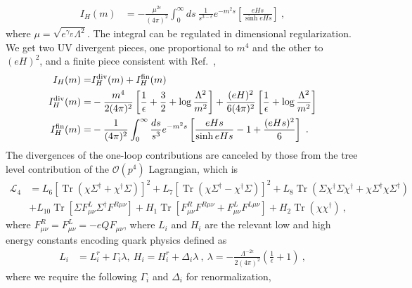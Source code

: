 \documentclass[12pt]{elsarticle}
\DeclareMathOperator{\Tr}{Tr}
\begin{document}
\begin{equation}
\begin{split}
I_{H}(m)&=-\frac{\mu^{2\epsilon}}{(4\pi)^{2}}\int_{0}^{\infty} ds\ \frac{1}{s^{3-\epsilon}}e^{-m^{2}s}\left[\frac{eHs}{\sinh eHs}\right]\ ,
\end{split}
\end{equation}
where $\mu=\sqrt{e^{\gamma_{E}}\Lambda^{2}}$. The integral can be regulated in dimensional regularization. We get two UV divergent pieces, one proportional to $m^{4}$ and the other to $(eH)^{2}$, and a finite piece consistent with Ref.~\cite{Schwinger:1951nm},
\begin{align}
I_{H}(m)=&I_{H}^{\rm div}(m)+I_{H}^{\rm fin}(m)\\
I_{H}^{\rm div}(m)=&-\frac{m^{4}}{2(4\pi)^{2}}\left[\frac{1}{\epsilon}+\frac{3}{2}+\log\frac{\Lambda^{2}}{m^{2}} \right]+\frac{(eH)^{2}}{6(4\pi)^{2}}\left[\frac{1}{\epsilon}+\log\frac{\Lambda^{2}}{m^{2}}\right]\\
I_{H}^{\rm fin}(m)=&-\frac{1}{(4\pi)^{2}}\int_{0}^{\infty} \frac{ds}{s^{3}}e^{-m^{2}s}\left[\frac{eHs}{\sinh eHs}-1+\frac{(eHs)^{2}}{6}\right]\ .
\end{align}
The divergences of the one-loop contributions are canceled by those from the tree level contribution of the $\mathcal{O}(p^{4})$ Lagrangian, which is
\begin{equation}
\begin{split}
\label{eq:L4}
\mathcal{L}_{4}&=L_{6}\left [\Tr(\chi\Sigma^{\dagger}+\chi^{\dagger}\Sigma)\right ]^{2}+L_{7}\left [\Tr(\chi\Sigma^{\dagger}-\chi^{\dagger}\Sigma)\right ]^{2}+L_{8}\Tr \left(\Sigma \chi^{\dagger}\Sigma \chi^{\dagger}+\chi\Sigma^{\dagger}\chi\Sigma^{\dagger} \right )\\
&+L_{10}\Tr\left [\Sigma F_{\mu\nu}^{L}\Sigma^{\dagger}F^{R\mu\nu}\right ]+H_{1}\Tr\left [F_{\mu\nu}^{R}F^{R\mu\nu}+F_{\mu\nu}^{L}F^{L\mu\nu} \right ]+H_{2}\Tr(\chi \chi^{\dagger})\ ,
\end{split}
\end{equation}
where $F_{\mu\nu}^{R}=F_{\mu\nu}^{L}=-eQF_{\mu\nu}$, where $L_{i}$ and $H_{i}$ are the relevant low and high energy constants encoding quark physics defined as
\begin{align}
\label{lihi}
L_{i}&=L_{i}^{r}+\Gamma_{i}\lambda,\ H_{i}=H_{i}^{r}+\Delta_{i}\lambda\ ,\ \lambda=-\frac{\Lambda^{-2\epsilon}}{2(4\pi)^{2}}\left(\frac{1}{\epsilon}+1\right)\ ,
\end{align}
where we require the following $\Gamma_{i}$ and $\Delta_{i}$ for renormalization,
\end{document}
